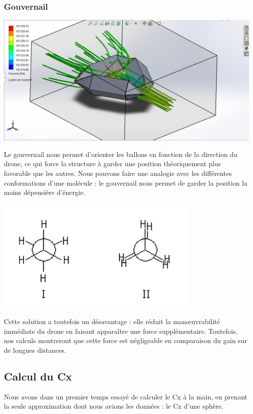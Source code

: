 \documentclass[a4paper,11pt]{article}
\begin{document}
\subsubsection{Gouvernail}
	\begin{center}
		\includegraphics[width=14cm]{../Images/Capture.PNG}
	\end{center}
	Le gouvernail nous permet d'orienter les ballons en fonction de la direction du drone, ce qui force la structure à garder une position théoriquement plus favorable que les autres.
	Nous pouvons faire une analogie avec les différentes conformations d'une molécule : le gouvernail nous permet de garder la position la moins dépensière d'énergie.\\
	\begin{center}
		\includegraphics[width=10cm]{../Images/conformations.png}
	\end{center}
  Cette solution a toutefois un désavantage : elle réduit la manœuvrabilité immédiate du drone en faisant apparaître une force supplémentaire. Toutefois, nos calculs montreront que cette force est négligeable en comparaison du gain sur de longues distances.

\subsection{Calcul du Cx}
	Nous avons dans un premier temps essayé de calculer le Cx à la main, en prenant la seule approximation dont nous avions les données : le Cx d'une sphère.
\end{document}
